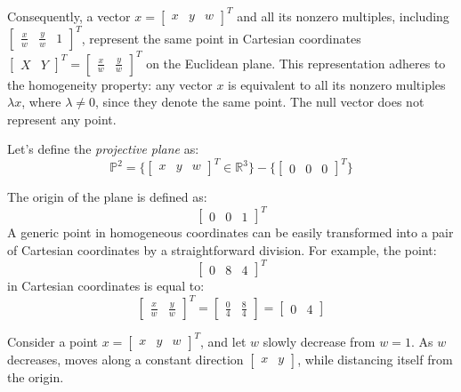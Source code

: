 Consequently, a vector $x = {\begin{bmatrix} x & y & w \end{bmatrix}}^T$ and all its nonzero multiples, including ${\begin{bmatrix} \frac{x}{w} & \frac{y}{w} & 1 \end{bmatrix}}^T$, represent the same point in Cartesian coordinates ${\begin{bmatrix} X & Y \end{bmatrix}}^T={\begin{bmatrix}  \frac{x}{w} &  \frac{y}{w} \end{bmatrix}}^T$ on the Euclidean plane. 
This representation adheres to the homogeneity property: any vector $x$ is equivalent to all its nonzero multiples $\lambda x$, where $\lambda \neq 0$, since they denote the same point.
The null vector does not represent any point.
\newpage
\begin{definition}
    Let's define the \emph{projective plane} as:
    \[\mathbb{P}^2=\{{\begin{bmatrix} x & y & w \end{bmatrix}}^T \in \mathbb{R}^3\}-\{{\begin{bmatrix} 0 & 0 & 0 \end{bmatrix}}^T\}\]
\end{definition}
\begin{example}
    The origin of the plane is defined as:
    \[{\begin{bmatrix} 0 & 0 & 1 \end{bmatrix}}^T\]
    A generic point in homogeneous coordinates can be easily transformed into a pair of Cartesian coordinates by a straightforward division. 
    For example, the point:
    \[{\begin{bmatrix} 0 & 8 & 4 \end{bmatrix}}^T\]
    in Cartesian coordinates is equal to:
    \[{\begin{bmatrix} \frac{x}{w} & \frac{y}{w} \end{bmatrix}}^T=\begin{bmatrix} \frac{0}{4} & \frac{8}{4} \end{bmatrix}=\begin{bmatrix} 0 & 4 \end{bmatrix}\]
\end{example}
Consider a point $x={\begin{bmatrix} x & y & w \end{bmatrix}}^T$, and let $w$ slowly decrease from $w=1$. 
As $w$ decreases, moves along a constant direction $\begin{bmatrix} x & y \end{bmatrix}$, while distancing itself from the origin. 
